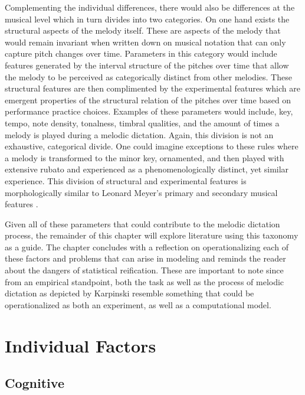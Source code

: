 \documentclass[]{book}
\begin{document}
Complementing the individual differences, there would also be differences at the musical level which in turn divides into two categories.
On one hand exists the structural aspects of the melody itself.
These are aspects of the melody that would remain invariant when written down on musical notation that can only capture pitch changes over time.
Parameters in this category would include features generated by the interval structure of the pitches over time that allow the melody to be perceived as categorically distinct from other melodies.
These structural features are then complimented by the experimental features which are emergent properties of the structural relation of the pitches over time based on performance practice choices.
Examples of these parameters would include, key, tempo, note density, tonalness, timbral qualities, and the amount of times a melody is played during a melodic dictation.
Again, this division is not an exhaustive, categorical divide.
One could imagine exceptions to these rules where a melody is transformed to the minor key, ornamented, and then played with extensive rubato and experienced as a phenomenologically distinct, yet similar experience.
This division of structural and experimental features is morphologically similar to Leonard Meyer's primary and secondary musical features \citep{meyerEmotionMeaningMusic1956}.

Given all of these parameters that could contribute to the melodic dictation process, the remainder of this chapter will explore literature using this taxonomy as a guide.
The chapter concludes with a reflection on operationalizing each of these factors and problems that can arise in modeling and reminds the reader about the dangers of statistical reification.
These are important to note since from an empirical standpoint, both the task as well as the process of melodic dictation as depicted by Karpinski resemble something that could be operationalized as both an experiment, as well as a computational model.

\hypertarget{individual-factors}{%
\section{Individual Factors}\label{individual-factors}}

\hypertarget{cognitive}{%
\subsection{Cognitive}\label{cognitive}}
\end{document}
